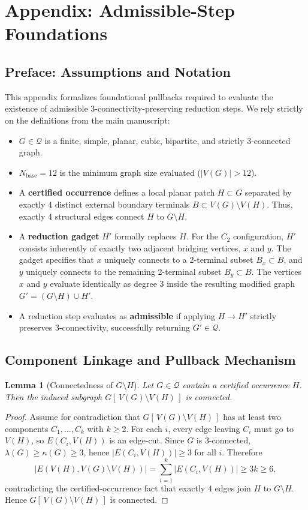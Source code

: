 \documentclass[12pt]{article}
\newtheorem{lemma}[theorem]{Lemma}
\begin{document}
\section*{Appendix: Admissible-Step Foundations}

\subsection*{Preface: Assumptions and Notation}
This appendix formalizes foundational pullbacks required to evaluate the existence of admissible 3-connectivity-preserving reduction steps. We rely strictly on the definitions from the main manuscript:
\begin{itemize}
    \item $G \in \mathcal{Q}$ is a finite, simple, planar, cubic, bipartite, and strictly 3-connected graph.
    \item $N_{\mathrm{base}} = 12$ is the minimum graph size evaluated ($|V(G)| > 12$).
    \item A \textbf{certified occurrence} defines a local planar patch $H \subset G$ separated by exactly 4 distinct external boundary terminals $B \subset V(G) \setminus V(H)$. Thus, exactly 4 structural edges connect $H$ to $G \setminus H$.
    \item A \textbf{reduction gadget} $H'$ formally replaces $H$. For the $C_2$ configuration, $H'$ consists inherently of exactly two adjacent bridging vertices, $x$ and $y$. The gadget specifies that $x$ uniquely connects to a 2-terminal subset $B_x \subset B$, and $y$ uniquely connects to the remaining 2-terminal subset $B_y \subset B$. The vertices $x$ and $y$ evaluate identically as degree 3 inside the resulting modified graph $G' = (G \setminus H) \cup H'$.
    \item A reduction step evaluates as \textbf{admissible} if applying $H \to H'$ strictly preserves 3-connectivity, successfully returning $G' \in \mathcal{Q}$.
\end{itemize}

\subsection*{Component Linkage and Pullback Mechanism}

\begin{lemma}[Connectedness of $G \setminus H$]
\label{lem:isolated_neighborhood}
Let $G \in \mathcal{Q}$ contain a certified occurrence $H$. Then the induced subgraph
$G[\,V(G)\setminus V(H)\,]$ is connected.
\end{lemma}
\begin{proof}
Assume for contradiction that $G[\,V(G)\setminus V(H)\,]$ has at least two components
$C_1,\dots,C_k$ with $k\ge 2$.
For each $i$, every edge leaving $C_i$ must go to $V(H)$, so $E(C_i,V(H))$ is an edge-cut.
Since $G$ is 3-connected, $\lambda(G)\ge \kappa(G)\ge 3$, hence $|E(C_i,V(H))|\ge 3$ for all $i$.
Therefore
\[
|E(V(H),V(G)\setminus V(H))|
=\sum_{i=1}^k |E(C_i,V(H))|
\ge 3k \ge 6,
\]
contradicting the certified-occurrence fact that exactly $4$ edges join $H$ to $G\setminus H$.
Hence $G[\,V(G)\setminus V(H)\,]$ is connected.
\end{proof}
\end{document}
